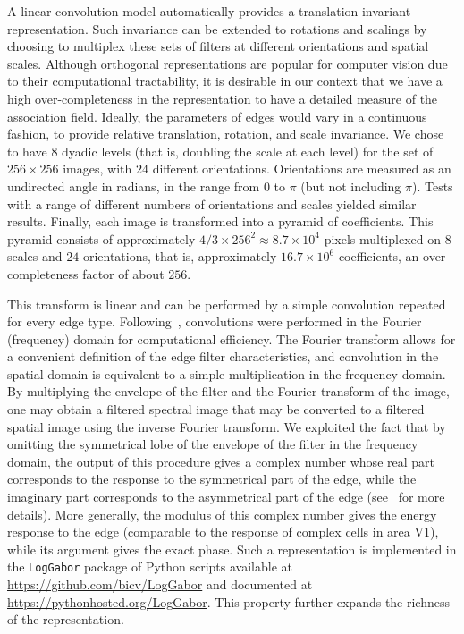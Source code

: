 \documentclass[a4paper]{article}
\newcounter{num}
\begin{document}
A linear convolution model automatically provides a translation-invariant representation. 
Such invariance can be extended to rotations and scalings 
by choosing to multiplex these sets of filters at different orientations and spatial scales. 
Although orthogonal representations are popular for computer vision 
due to their computational tractability, 
it is desirable in our context that we have a high over-completeness 
in the representation to have a detailed measure of the association field. 
Ideally, the parameters of edges would vary in a continuous fashion, 
to provide relative translation, rotation, and scale invariance. 
We chose to have $8$ dyadic levels (that is, doubling the scale at each level)
for the set of $256\times 256$ images, with $24$ different orientations.
Orientations are measured as an undirected angle in radians, 
in the range from $0$ to $\pi$ (but not including $\pi$). 
Tests with a range of different numbers of orientations and scales yielded similar results. 
Finally, each image is transformed into a pyramid of coefficients. 
This pyramid consists of approximately $4/3\times256^{2}\approx8.7\times10^4$ pixels 
multiplexed on $8$ scales and $24$ orientations, that is, 
approximately $16.7\times10^6$ coefficients, an over-completeness factor of about $256$.

This transform is linear and can be performed by a simple convolution 
repeated for every edge type. 
Following~\textcite{Fischer07cv}, convolutions were performed in the Fourier (frequency) domain
for computational efficiency. 
The Fourier transform allows for a convenient definition of the edge filter characteristics,
and convolution in the spatial domain is equivalent to a simple multiplication in the frequency domain. 
By multiplying the envelope of the filter and the Fourier transform of the image, 
one may obtain a filtered spectral image that may be converted to 
a filtered spatial image using the inverse Fourier transform. 
We exploited the fact that by omitting the symmetrical lobe of the envelope of the filter 
in the frequency domain, 
the output of this procedure gives a complex number whose 
real part corresponds to the response to the symmetrical part of the edge, 
while the imaginary part corresponds to the asymmetrical part of the edge 
(see~\textcite{Fischer07cv} for more details). 
More generally, the modulus of this complex number gives the energy response 
to the edge (comparable to the response of complex cells in area V1), 
while its argument gives the exact phase. 
Such a representation is implemented in the \verb+LogGabor+ package of 
Python scripts available at \url{https://github.com/bicv/LogGabor} and 
documented at \url{https://pythonhosted.org/LogGabor}.
This property further expands the richness of the representation.
\end{document}
